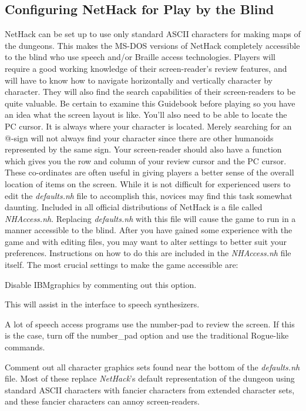 \subsection*{Configuring NetHack for Play by the Blind}

NetHack can be set up to use only standard ASCII characters for making
maps of the dungeons. This makes the MS-DOS versions of NetHack completely
accessible to the blind who use speech and/or Braille access technologies.
Players will require a good working knowledge of their screen-reader's
review features, and will have to know how to navigate horizontally and
vertically character by character. They will also find the search
capabilities of their screen-readers to be quite valuable. Be certain to
examine this Guidebook before playing so you have an idea what the screen
layout is like. You'll also need to be able to locate the PC cursor. It is
always where your character is located. Merely searching for an @-sign will
not always find your character since there are other humanoids represented
by the same sign. Your screen-reader should also have a function which
gives you the row and column of your review cursor and the PC cursor.
These co-ordinates are often useful in giving players a better sense of the
overall location of items on the screen.
While it is not difficult for experienced users to edit the {\it defaults.nh\/}
file to accomplish this, novices may find this task somewhat daunting.
Included in all official distributions of NetHack is a file called
{\it NHAccess.nh\/}.  Replacing {\it defaults.nh\/} with this file will cause
the game to run in a manner accessible to the blind. After you have gained
some experience with the game and with editing files, you may want to alter
settings to better suit your preferences. Instructions on how to do this
are included in the {\it NHAccess.nh\/} file itself. The most crucial
settings to make the game accessible are:
\blist{}
\item[\ib{IBMgraphics}]
Disable IBMgraphics by commenting out this option.
\item[\ib{menustyle:traditional}]
This will assist in the interface to speech synthesizers.
\item[\ib{!number\_pad}]
A lot of speech access programs use the number-pad to review the screen.
If this is the case, turn off the number\_pad option and use the traditional
Rogue-like commands.
\item[\ib{Character graphics}]
Comment out all character graphics sets found near the bottom of the
{\it defaults.nh\/} file.  Most of these replace {\it NetHack\/}'s
default representation of the dungeon using standard ASCII characters
with fancier characters from extended character sets, and these fancier
characters can annoy screen-readers.
\elist

